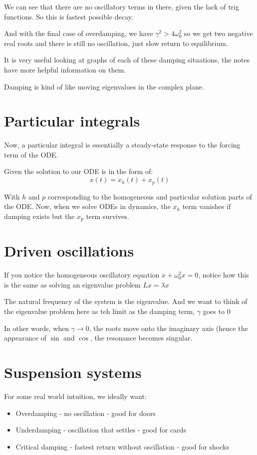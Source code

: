 We can see that there are no oscillatory terms in there, given the lack of trig functions. So this is fastest possible decay. 

And with the final case of overdamping, we have $\gamma^2 > 4\omega_0^2$ so we get two negative real roots and there is still no oscillation, just slow return to equilibrium. 

It is very useful looking at graphs of each of these damping situations, the notes have more helpful information on them. 

Damping is kind of like moving eigenvalues in the complex plane. 


\section{Particular integrals}

Now, a particular integral is essentially a steady-state response to the forcing term of the ODE. 

Given the solution to our ODE is in the form of: 
$$
x(t) = x_h(t) + x_p(t)
$$

With $h$ and $p$ corresponding to the homogeneous and particular solution parts of the ODE. Now, when we solve ODEs in dynamics, the $x_h$ term vanishes if damping exists but the $x_p$ term survives. 


\section{Driven oscillations}

If you notice the homogeneous oscillatory equation $\ddot{x} + \omega_0^2 x = 0$, notice how this is the same as solving an eigenvalue problem $Lx = \lambda x$

The natural frequency of the system is the eigenvalue. And we want to think of the eigenvalue problem here as teh limit as the damping term, $\gamma$ goes to $0$

In other words, when $\gamma \to 0$, the roots move onto the imaginary axis (hence the appearance of $\sin$ and $\cos$, the resonance becomes singular. 

\section{Suspension systems}

For some real world intuition, we ideally want: 
\begin{itemize}
    \item Overdamping - no oscillation - good for doors 
    \item Underdamping - oscillation that settles - good for cards 
    \item Critical damping - fastest return without oscillation - good for shocks
\end{itemize}


